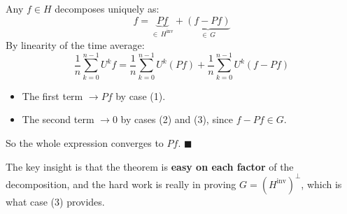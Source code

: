\documentclass{article}
\begin{document}
\begin{mdframed}
Any $f \in H$ decomposes uniquely as:
\[
f = \underbrace{Pf}_{\in\, H^{\text{inv}}} + \underbrace{(f - Pf)}_{\in\, G}
\]
By linearity of the time average:
\[
\frac{1}{n}\sum_{k=0}^{n-1}U^k f = \frac{1}{n}\sum_{k=0}^{n-1}U^k(Pf) + \frac{1}{n}\sum_{k=0}^{n-1}U^k(f-Pf)
\]
\begin{itemize}
    \item The first term $\to Pf$ by case (1).
    \item The second term $\to 0$ by cases (2) and (3), since $f - Pf \in G$.
\end{itemize}
So the whole expression converges to $Pf$. $\blacksquare$

The key insight is that the theorem is \textbf{easy on each factor} of the decomposition, 
and the hard work is really in proving $G = (H^{\text{inv}})^\perp$, which is what case (3) provides.
\end{mdframed}
\end{document}
